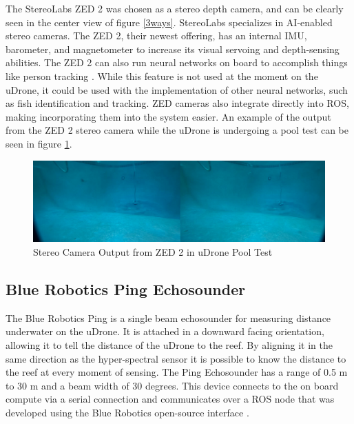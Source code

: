 The StereoLabs ZED 2 was chosen as a stereo depth camera, and can be clearly seen in the center view of figure \ref{3ways}. StereoLabs specializes in AI-enabled stereo cameras. The ZED 2, their newest offering, has an internal IMU, barometer, and magnetometer to increase its visual servoing and depth-sensing abilities. The ZED 2 can also run neural networks on board to accomplish things like person tracking \parencite{zed}. While this feature is not used at the moment on the uDrone, it could be used with the implementation of other neural networks, such as fish identification and tracking. ZED cameras also integrate directly into ROS, making incorporating them into the system easier. An example of the output from the ZED 2 stereo camera while the uDrone is undergoing a pool test can be seen in figure \ref{stereo}.

\begin{figure}[ht]
\includegraphics[width=\maxwidth{\textwidth}]{img/zed_pool.png}
\caption{Stereo Camera Output from ZED 2 in uDrone Pool Test}
\label{stereo}
\end{figure}


\subsection{Blue Robotics Ping Echosounder}

The Blue Robotics Ping is a single beam echosounder for measuring distance underwater on the uDrone. It is attached in a downward facing orientation, allowing it to tell the distance of the uDrone to the reef. By aligning it in the same direction as the hyper-spectral sensor it is possible to know the distance to the reef at every moment of sensing. The Ping Echosounder has a range of 0.5 m to 30 m and a beam width of 30 degrees. This device connects to the on board compute via a serial connection and communicates over a ROS node that was developed using the Blue Robotics open-source interface \parencite{pinger}. 

